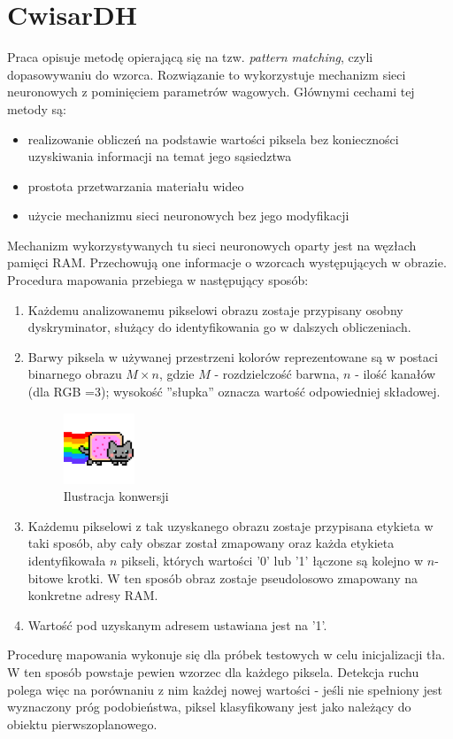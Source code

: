 \section{CwisarDH}
Praca \cite{6910014} opisuje metodę opierającą się na tzw. \textit{pattern matching}, czyli dopasowywaniu do wzorca. Rozwiązanie to wykorzystuje mechanizm sieci neuronowych z pominięciem parametrów wagowych. Głównymi cechami tej metody są:
\begin{itemize}
\item realizowanie obliczeń na podstawie wartości piksela bez konieczności uzyskiwania informacji na temat jego sąsiedztwa
\item prostota przetwarzania materiału wideo
\item użycie mechanizmu sieci neuronowych bez jego modyfikacji
\end{itemize}
Mechanizm wykorzystywanych tu sieci neuronowych oparty jest na węzłach pamięci RAM. Przechowują one informacje o wzorcach występujących w obrazie. Procedura mapowania przebiega w następujący sposób:
\begin{enumerate}
\item Każdemu analizowanemu pikselowi obrazu zostaje przypisany osobny dyskryminator, służący do identyfikowania go w dalszych obliczeniach.
\item Barwy piksela w używanej przestrzeni kolorów reprezentowane są w postaci binarnego obrazu $M \times n$, gdzie $M$ - rozdzielczość barwna, $n$ - ilość kanałów (dla RGB =3); wysokość ''słupka'' oznacza wartość odpowiedniej składowej.

\begin{figure}[!htb]
\centering
\includegraphics[width=0.2\textwidth]{img/sample}
\caption{Ilustracja konwersji}
\end{figure}

\item Każdemu pikselowi z tak uzyskanego obrazu zostaje przypisana etykieta w taki sposób, aby cały obszar został zmapowany oraz każda etykieta identyfikowała $n$ pikseli, których wartości '0' lub '1' łączone są kolejno w $n$-bitowe krotki. W ten sposób obraz zostaje pseudolosowo zmapowany na konkretne adresy RAM.
\item Wartość pod uzyskanym adresem ustawiana jest na '1'.
\end{enumerate}
Procedurę mapowania wykonuje się dla próbek testowych w celu inicjalizacji tła. W ten sposób powstaje pewien wzorzec dla każdego piksela. Detekcja ruchu polega więc na porównaniu z nim każdej nowej wartości - jeśli nie spełniony jest wyznaczony próg podobieństwa, piksel klasyfikowany jest jako należący do obiektu pierwszoplanowego.
